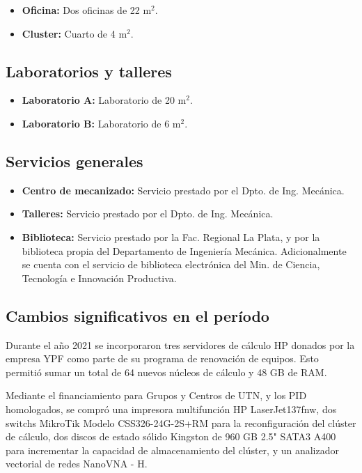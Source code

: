 \documentclass[a4paper,11pt,twoside,final,titlepage,onecolumn,openright]{report}
\begin{document}
\begin{itemize}
 \item {\bf Oficina:} Dos oficinas de 22 m$^2$. 
 \item {\bf Cluster:} Cuarto de 4 m$^2$. 
\end{itemize}

\subsection{Laboratorios y talleres}

\begin{itemize}
 \item {\bf Laboratorio A:} Laboratorio de 20 m$^2$.
 \item {\bf Laboratorio B:} Laboratorio de 6 m$^2$.
\end{itemize}

\subsection{Servicios generales}

\begin{itemize}
 \item {\bf Centro de mecanizado:} Servicio prestado por el Dpto. de Ing. Mecánica.
 \item {\bf Talleres:} Servicio prestado por el Dpto. de Ing. Mecánica.
 \item {\bf Biblioteca:} Servicio prestado por la Fac. Regional La Plata, y por la biblioteca propia del Departamento de Ingeniería Mecánica. Adicionalmente se cuenta con el servicio de biblioteca electrónica del Min. de Ciencia, Tecnología e Innovación Productiva. 
\end{itemize}

\subsection{Cambios significativos en el período}
Durante el año 2021 se incorporaron tres servidores de cálculo HP donados por la empresa YPF como parte de su programa de renovación de equipos. Esto permitió sumar un total de 64 nuevos núcleos de cálculo y 48 GB de RAM.

Mediante el financiamiento para Grupos y Centros de UTN, y los PID homologados, se compró una impresora multifunción HP LaserJet137fnw, dos switchs MikroTik Modelo CSS326-24G-2S+RM para la reconfiguración del clúster de cálculo, dos discos de estado sólido Kingston de 960 GB 2.5"{} SATA3 A400 para incrementar la capacidad de almacenamiento del clúster, y un analizador vectorial de redes NanoVNA - H.
\end{document}
